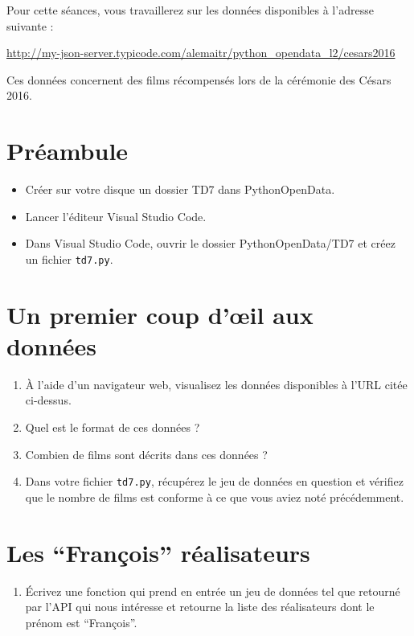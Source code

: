 \documentclass[11pt,a4paper]{article}
\begin{document}
Pour cette séances, vous travaillerez sur les données disponibles à l'adresse suivante :

\begin{center}
    \url{http://my-json-server.typicode.com/alemaitr/python_opendata_l2/cesars2016}
\end{center}

Ces données concernent des films récompensés lors de la cérémonie des Césars 2016.

\section*{Préambule}
\begin{itemize}
    \item Créer sur votre disque un dossier TD7 dans PythonOpenData.
    \item Lancer l'éditeur Visual Studio Code.
    \item Dans Visual Studio Code, ouvrir le dossier PythonOpenData/TD7 et créez un fichier \verb+td7.py+. 
\end{itemize}



\section{Un premier coup d'\oe{}il aux données}

\begin{enumerate}
    \item À l'aide d'un navigateur web, visualisez les données disponibles à l'URL citée ci-dessus.
    \item Quel est le format de ces données ?
    \item Combien de films sont décrits dans ces données ?
    \item Dans votre fichier \verb+td7.py+, récupérez le jeu de données en question et vérifiez que le nombre de films est conforme à ce que vous aviez noté précédemment.
\end{enumerate}

\section{Les ``François'' réalisateurs}

\begin{enumerate}
    \item Écrivez une fonction qui prend en entrée un jeu de données tel que retourné par l'API qui nous intéresse et retourne la liste des réalisateurs dont le prénom est ``François''.
\end{enumerate}
\end{document}

